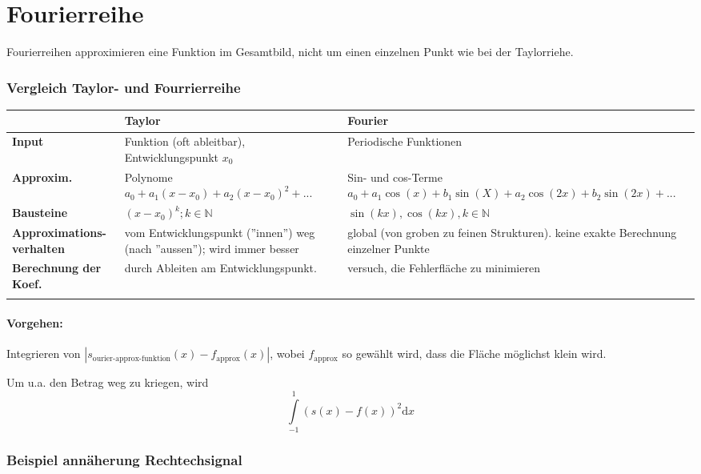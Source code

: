 \section{Fourierreihe}

Fourierreihen approximieren eine Funktion im Gesamtbild, nicht um einen einzelnen Punkt wie bei der Taylorriehe.

\subsubsection{Vergleich Taylor- und Fourrierreihe}

\begin{tabu} to \linewidth {l | X X }
& \textbf{Taylor} & \textbf{Fourier} \hfill \\
\hline

\textbf{Input} & Funktion (oft ableitbar), Entwicklungspunkt $x_0$ & Periodische Funktionen \\
\hline

\textbf{Approxim.} & Polynome $a_0  + a_1 (x-x_0) + a_2(x-x_0)^2 + ...$ & Sin- und cos-Terme $a_0+a_1 \cos(x)+b_1 \sin(X) + a_2 \cos(2x) + b_2 \sin(2x) + ...$ \\
\hline

\textbf{Bausteine} &$(x-x_0)^k; k \in \mathbb{N}$ &$\sin(kx), \cos(kx), k \in \mathbb{N}$ \\
\hline

\textbf{Approximations-verhalten} & vom Entwicklungspunkt (''innen'') weg (nach ''aussen''); wird immer besser & global (von groben zu feinen Strukturen). keine exakte Berechnung einzelner Punkte \\
\hline

\textbf{Berechnung der Koef.} & durch Ableiten am Entwicklungspunkt. & versuch, die Fehlerfläche zu minimieren \\ %
\lasthline
\end{tabu}

\paragraph{Vorgehen:}
Integrieren von $|s_\text{ourier-approx-funktion}(x)-f_\text{approx}(x)|$, wobei $f_\text{approx}$ so gewählt wird, dass die Fläche möglichst klein wird.%

Um u.a. den Betrag weg zu kriegen, wird 
\[
	\int\limits^1_{-1}(s(x)-f(x))^2 \mathrm{d}x
\]


\subsubsection{Beispiel annäherung Rechtechsignal}

